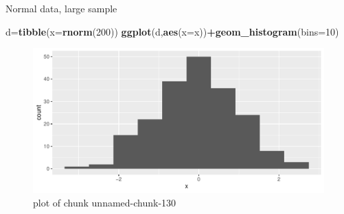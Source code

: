 \documentclass[ignorenonframetext,]{beamer}
\newenvironment{Shaded}{\begin{snugshade}}{\end{snugshade}}
\newcommand{\DataTypeTok}[1]{\textcolor[rgb]{0.13,0.29,0.53}{#1}}
\newcommand{\DecValTok}[1]{\textcolor[rgb]{0.00,0.00,0.81}{#1}}
\newcommand{\KeywordTok}[1]{\textcolor[rgb]{0.13,0.29,0.53}{\textbf{#1}}}
\newcommand{\NormalTok}[1]{#1}
\newcommand{\OperatorTok}[1]{\textcolor[rgb]{0.81,0.36,0.00}{\textbf{#1}}}
\begin{document}
\begin{frame}[fragile]{Normal data, large sample}
\protect\hypertarget{normal-data-large-sample}{}

\begin{Shaded}
\begin{Highlighting}[]
\NormalTok{d=}\KeywordTok{tibble}\NormalTok{(}\DataTypeTok{x=}\KeywordTok{rnorm}\NormalTok{(}\DecValTok{200}\NormalTok{))}
\KeywordTok{ggplot}\NormalTok{(d,}\KeywordTok{aes}\NormalTok{(}\DataTypeTok{x=}\NormalTok{x))}\OperatorTok{+}\KeywordTok{geom_histogram}\NormalTok{(}\DataTypeTok{bins=}\DecValTok{10}\NormalTok{)}
\end{Highlighting}
\end{Shaded}

\begin{figure}
\centering
\includegraphics{figure/unnamed-chunk-130-1.pdf}
\caption{plot of chunk unnamed-chunk-130}
\end{figure}

\end{frame}
\end{document}
